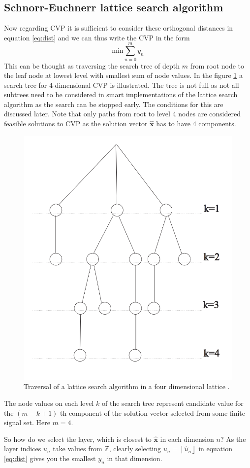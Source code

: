 \documentclass[english,12pt,a4paper,pdftex,sci,utf8]{aaltothesis}
\begin{document}
\subsection{Schnorr-Euchnerr lattice search algorithm}
Now regarding CVP it is sufficient to consider these orthogonal distances in equation \eqref{eq:dist} and we can thus write the CVP in the form
\begin{equation}
\text{min} \sum_{n = 0}^{m} y_n
\label{eq:cvp}
\end{equation}
This can be thought as traversing the search tree of depth $m$ from root node to the leaf node at lowest level with smallest sum of node values. In the figure \ref{fig:tree} a search tree for 4-dimensional CVP is illustrated. The tree is not full as not all subtrees need to be considered in smart implementations of the lattice search algorithm as the search can be stopped early. The conditions for this are discussed later. Note that only paths from root to level 4 nodes are considered feasible solutions to CVP as the solution vector $\mathbf{\hat{x}}$ has to have 4 components.
\begin{figure}[ht] 
  \centering
  \includegraphics[width=0.5\linewidth]{search-tree}
  \caption{Traversal of a lattice search algorithm in a four dimensional lattice \cite{mia}.}
  \label{fig:tree}
\end{figure}
The node values on each level $k$ of the search tree represent candidate value for the $(m-k+1)$-th component of the solution vector selected from some finite signal set. Here $m = 4$.
\par So how do we select the layer, which is closest to $\mathbf{\hat{x}}$ in each dimension $n$? As the layer indices $u_n$ take values from $\mathbb{Z}$, clearly selecting $u_n = \left\lceil\hat{u}_n\right\rfloor$ in equation \eqref{eq:dist} gives you the smallest $y_n$ in that dimension. 
\end{document}
